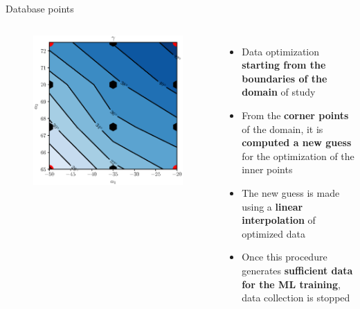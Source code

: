 \begin{frame}{Database points}
{\begin{columns}
            \begin{figure}
                \centering
                \includegraphics[scale=0.5]{images/staggerComplete.eps}
            \end{figure}
            \begin{itemize}
                \item Data optimization \textbf{starting from the boundaries of the domain} of study
                \item From the \textbf{corner points} of the domain, it is \textbf{computed a new guess} for the optimization of the inner points
                \item The new guess is made using a \textbf{linear interpolation} of optimized data 
                \item Once this procedure generates \textbf{sufficient data for the ML training}, data collection is stopped
            \end{itemize}
        \end{columns}
    }
\end{frame}

